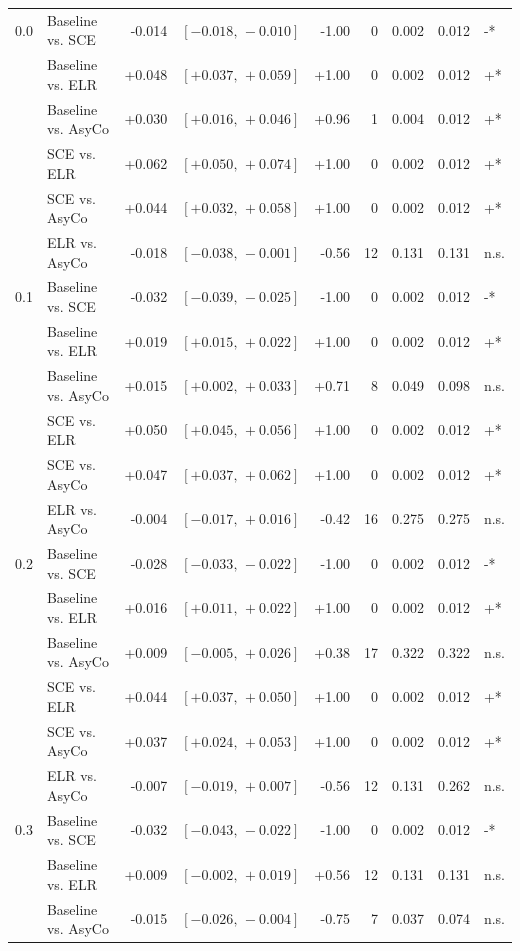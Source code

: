 \begin{small}
\begin{longtable}{llrrrrrrl}
0.0 & Baseline vs. SCE & -0.014 & $[-0.018,\,-0.010]$ & -1.00 & 0 & 0.002 & 0.012 & -* \\
 & Baseline vs. ELR & +0.048 & $[+0.037,\,+0.059]$ & +1.00 & 0 & 0.002 & 0.012 & +* \\
 & Baseline vs. AsyCo & +0.030 & $[+0.016,\,+0.046]$ & +0.96 & 1 & 0.004 & 0.012 & +* \\
 & SCE vs. ELR & +0.062 & $[+0.050,\,+0.074]$ & +1.00 & 0 & 0.002 & 0.012 & +* \\
 & SCE vs. AsyCo & +0.044 & $[+0.032,\,+0.058]$ & +1.00 & 0 & 0.002 & 0.012 & +* \\
 & ELR vs. AsyCo & -0.018 & $[-0.038,\,-0.001]$ & -0.56 & 12 & 0.131 & 0.131 & n.s. \\
0.1 & Baseline vs. SCE & -0.032 & $[-0.039,\,-0.025]$ & -1.00 & 0 & 0.002 & 0.012 & -* \\
 & Baseline vs. ELR & +0.019 & $[+0.015,\,+0.022]$ & +1.00 & 0 & 0.002 & 0.012 & +* \\
 & Baseline vs. AsyCo & +0.015 & $[+0.002,\,+0.033]$ & +0.71 & 8 & 0.049 & 0.098 & n.s. \\
 & SCE vs. ELR & +0.050 & $[+0.045,\,+0.056]$ & +1.00 & 0 & 0.002 & 0.012 & +* \\
 & SCE vs. AsyCo & +0.047 & $[+0.037,\,+0.062]$ & +1.00 & 0 & 0.002 & 0.012 & +* \\
 & ELR vs. AsyCo & -0.004 & $[-0.017,\,+0.016]$ & -0.42 & 16 & 0.275 & 0.275 & n.s. \\
0.2 & Baseline vs. SCE & -0.028 & $[-0.033,\,-0.022]$ & -1.00 & 0 & 0.002 & 0.012 & -* \\
 & Baseline vs. ELR & +0.016 & $[+0.011,\,+0.022]$ & +1.00 & 0 & 0.002 & 0.012 & +* \\
 & Baseline vs. AsyCo & +0.009 & $[-0.005,\,+0.026]$ & +0.38 & 17 & 0.322 & 0.322 & n.s. \\
 & SCE vs. ELR & +0.044 & $[+0.037,\,+0.050]$ & +1.00 & 0 & 0.002 & 0.012 & +* \\
 & SCE vs. AsyCo & +0.037 & $[+0.024,\,+0.053]$ & +1.00 & 0 & 0.002 & 0.012 & +* \\
 & ELR vs. AsyCo & -0.007 & $[-0.019,\,+0.007]$ & -0.56 & 12 & 0.131 & 0.262 & n.s. \\
0.3 & Baseline vs. SCE & -0.032 & $[-0.043,\,-0.022]$ & -1.00 & 0 & 0.002 & 0.012 & -* \\
 & Baseline vs. ELR & +0.009 & $[-0.002,\,+0.019]$ & +0.56 & 12 & 0.131 & 0.131 & n.s. \\
 & Baseline vs. AsyCo & -0.015 & $[-0.026,\,-0.004]$ & -0.75 & 7 & 0.037 & 0.074 & n.s. \\

\end{longtable}
\end{small}
